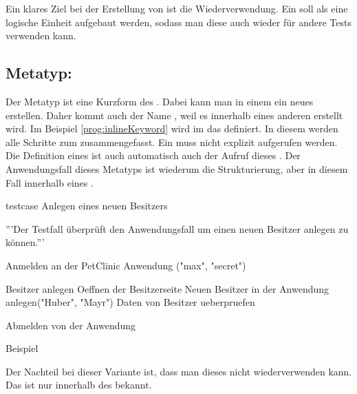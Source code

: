 \SuperPar
Ein klares Ziel bei der Erstellung von  ist die Wiederverwendung. Ein  soll als eine logische Einheit aufgebaut werden, sodass man diese auch wieder für andere Tests verwenden kann. 


\subsection{Metatyp: }

Der Metatyp  ist eine Kurzform des . Dabei kann man in einem  ein neues  erstellen. Daher kommt auch der Name , weil es innerhalb eines anderen  erstellt wird. Im Beispiel \ref{prog:inlineKeyword} wird im   das   definiert. In diesem  werden alle Schritte zum  zusammengefasst. Ein  muss nicht explizit aufgerufen werden. Die Definition eines  ist auch automatisch auch der Aufruf dieses . Der Anwendungsfall dieses Metatyps ist wiederum die Strukturierung, aber in diesem Fall innerhalb eines . 

\begin{program}
\begin{JavaCode}
testcase Anlegen eines neuen Besitzers {
	'''Der Testfall überprüft den Anwendungsfall um einen 
	   neuen Besitzer anlegen zu können.'''
	
	Anmelden an der PetClinic Anwendung ("max", "secret")
	
	Besitzer anlegen {
		Oeffnen der Besitzerseite		
		Neuen Besitzer in der Anwendung anlegen("Huber", "Mayr")
		Daten von Besitzer ueberpruefen
	}
	
	Abmelden von der Anwendung
}
\end{JavaCode}
\caption{Beispiel }
\label{prog:inlineKeyword}
\end{program}

\SuperPar
Der Nachteil bei dieser Variante ist, dass man dieses  nicht wiederverwenden kann. Das  ist nur innerhalb des  bekannt.

